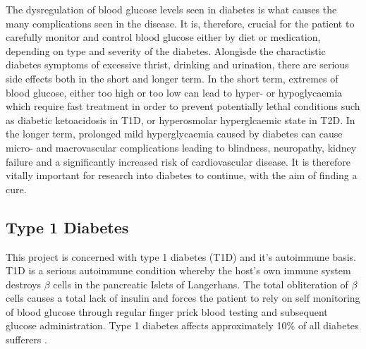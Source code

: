 {The dysregulation of blood glucose levels seen in diabetes is what causes the many complications seen in the disease.
It is, therefore, crucial for the patient to carefully monitor and control blood glucose either by diet or medication, depending on type and severity of the diabetes.
Alongisde the charactistic diabetes symptoms of excessive thrist, drinking and urination, there are serious side effects both in the short and longer term.
In the short term, extremes of blood glucose, either too high or too low can lead to hyper- or hypoglycaemia which require fast treatment in order to prevent potentially lethal conditions such as diabetic ketoacidosis in T1D, or hyperosmolar hyperglcaemic state in T2D.
In the longer term, prolonged mild hyperglycaemia caused by diabetes can cause micro- and macrovascular complications leading to blindness, neuropathy, kidney failure and a significantly increased risk of cardiovascular disease\citep{OxClinMed}.
It is therefore vitally important for research into diabetes to continue, with the aim of finding a cure.

\subsection{Type 1 Diabetes}

This project is concerned with type 1 diabetes (T1D) and it's autoimmune basis.
T1D is a serious autoimmune condition whereby the host's own immune system destroys $\beta$ cells in the pancreatic Islets of Langerhans.
The total obliteration of $\beta$ cells causes a total lack of insulin and forces the patient to rely on self monitoring of blood glucose through regular finger prick blood testing and subsequent glucose administration.
Type 1 diabetes affects approximately 10\% of all diabetes sufferers .}






